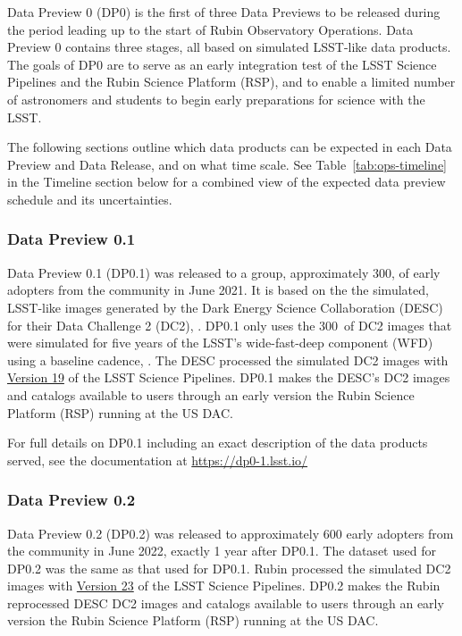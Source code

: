 Data Preview 0 (DP0) is the first of three Data Previews to be released during the period leading up to the start of Rubin Observatory Operations. 
Data Preview 0 contains three stages, all based on simulated LSST-like data products. 
The goals of DP0 are to serve as an early integration test of the LSST Science Pipelines and the Rubin Science Platform (RSP), and to enable a limited number of astronomers and students to begin early preparations for science with the LSST.

The following sections outline which data products can be expected in each Data Preview and Data Release, and on what time scale.
See Table~\ref{tab:ops-timeline} in the Timeline section below for a combined view of the expected data preview schedule and its uncertainties.

\subsubsection{Data Preview 0.1}
\label{sec:dp01}

Data Preview 0.1 (DP0.1) was released to a group, approximately 300,  of early adopters from the community in June 2021. 
It is based on the the simulated, LSST-like images generated by the Dark Energy Science Collaboration (DESC) for their Data Challenge 2 (DC2), \citep{2021ApJS..253...31L}. 
DP0.1 only uses the 300~\sqdeg of DC2 images that were simulated for five years of the LSST’s wide-fast-deep component (WFD) using a baseline cadence, .
The DESC processed the simulated DC2 images with \href{https://pipelines.lsst.io/v/v19_0_0/index.html}{Version 19} of the LSST Science Pipelines. 
DP0.1 makes the DESC’s DC2 images and catalogs available to users through an early version the Rubin Science Platform (RSP) running at the US DAC. 

For full details on DP0.1 including an exact description of the data products served, see the documentation at \url{https://dp0-1.lsst.io/}

\subsubsection{Data Preview 0.2}
\label{sec:dp02}

Data Preview 0.2 (DP0.2) was released to approximately 600 early adopters from the community in June 2022, exactly 1 year after DP0.1. 
The dataset used for DP0.2 was the same as that used for DP0.1.
Rubin processed the simulated DC2 images with \href{https://pipelines.lsst.io/v/v23_0_0/index.html}{Version 23} of the LSST Science Pipelines. 
DP0.2 makes the Rubin reprocessed DESC DC2 images and catalogs available to users through an early version the Rubin Science Platform (RSP) running at the US DAC. 

